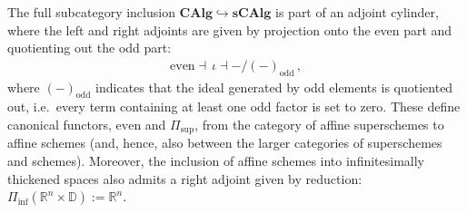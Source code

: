     \begin{property}[Cohesion]
        The full subcategory inclusion $\mathbf{CAlg}\hookrightarrow\mathbf{sCAlg}$ is part of an adjoint cylinder, where the left and right adjoints are given by projection onto the even part and quotienting out the odd part:
        \begin{gather}
            \mathrm{even}\dashv\,\iota\dashv-/(-)_{\text{odd}}\,,
        \end{gather}
        where $(-)_{\text{odd}}$ indicates that the ideal generated by odd elements is quotiented out, i.e.~every term containing at least one odd factor is set to zero. These define canonical functors, $\mathrm{even}$ and $\Pi_{\text{sup}}$, from the category of affine superschemes to affine schemes (and, hence, also between the larger categories of superschemes and schemes). Moreover, the inclusion of affine schemes into infinitesimally thickened spaces also admits a right adjoint given by reduction: $\Pi_{\text{inf}}(\mathbb{R}^n\times\mathbb{D}):=\mathbb{R}^n$.


\end{property}
